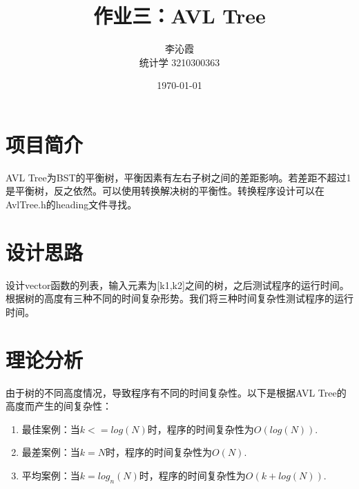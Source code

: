 \documentclass[a4paper]{article}
\title{作业三：AVL Tree}
\author{李沁霞 \\ 统计学 3210300363}
\date{\today}
\begin{document}
\maketitle

\section{项目简介}
AVL Tree为BST的平衡树，平衡因素有左右子树之间的差距影响。若差距不超过1是平衡树，反之依然。可以使用转换解决树的平衡性。转换程序设计可以在AvlTree.h的heading文件寻找。

\section{设计思路}
设计vector函数的列表，输入元素为[k1,k2]之间的树，之后测试程序的运行时间。根据树的高度有三种不同的时间复杂形势。我们将三种时间复杂性测试程序的运行时间。

\section{理论分析}
由于树的不同高度情况，导致程序有不同的时间复杂性。以下是根据AVL Tree的高度而产生的间复杂性：
\begin{enumerate}
    \item 最佳案例：当$k <= log(N)$时，程序的时间复杂性为$O(log(N))$.
    \item 最差案例：当$k = N$时，程序的时间复杂性为$O(N)$.
    \item 平均案例：当$k = log_{n}(N)$时，程序的时间复杂性为$O(k + log(N))$.
\end{enumerate}
\end{document}
